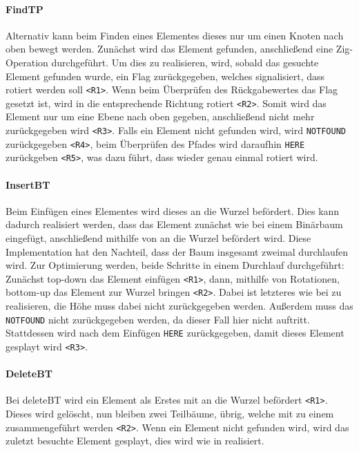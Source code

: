 \paragraph{FindTP}
Alternativ kann beim Finden eines Elementes dieses nur um einen Knoten nach oben bewegt werden.
Zunächst wird das Element gefunden, anschließend eine Zig-Operation durchgeführt.
Um dies zu realisieren, wird, sobald das gesuchte Element gefunden wurde, ein Flag zurückgegeben,
welches signalisiert, dass rotiert werden soll \verb|<R1>|.
Wenn beim Überprüfen des Rückgabewertes das Flag gesetzt ist, wird in die entsprechende Richtung
rotiert \verb|<R2>|.
Somit wird das Element nur um eine Ebene nach oben gegeben, anschließend nicht mehr zurückgegeben
wird \verb|<R3>|.
Falls ein Element nicht gefunden wird, wird \verb|NOTFOUND| zurückgegeben \verb|<R4>|, beim
Überprüfen des Pfades wird daraufhin \verb|HERE| zurückgeben \verb|<R5>|, was dazu führt, dass
wieder genau einmal rotiert wird.

\paragraph{InsertBT}
Beim Einfügen eines Elementes wird dieses an die Wurzel befördert.
Dies kann dadurch realisiert werden, dass das Element zunächst wie bei einem Binärbaum
eingefügt, anschließend mithilfe von  an die Wurzel befördert wird.
Diese Implementation hat den Nachteil, dass der Baum insgesamt zweimal durchlaufen wird.
Zur Optimierung werden, beide Schritte in einem Durchlauf durchgeführt: Zunächst top-down
das Element einfügen \verb|<R1>|, dann, mithilfe von Rotationen, bottom-up das Element zur Wurzel
bringen \verb|<R2>|.
Dabei ist letzteres wie bei  zu realisieren,
die Höhe muss dabei nicht zurückgegeben werden.
Außerdem muss das \verb|NOTFOUND| nicht zurückgegeben werden, da dieser Fall hier nicht auftritt.
Stattdessen wird nach dem Einfügen \verb|HERE| zurückgegeben, damit dieses Element gesplayt wird
\verb|<R3>|.

\paragraph{DeleteBT}
Bei deleteBT wird ein Element als Erstes mit  an die Wurzel befördert
\verb|<R1>|.
Dieses wird gelöscht, nun bleiben zwei Teilbäume, übrig, welche mit  zu einem
zusammengeführt werden \verb|<R2>|.
Wenn ein Element nicht gefunden wird, wird das zuletzt besuchte Element gesplayt, dies wird wie
in  realisiert.

